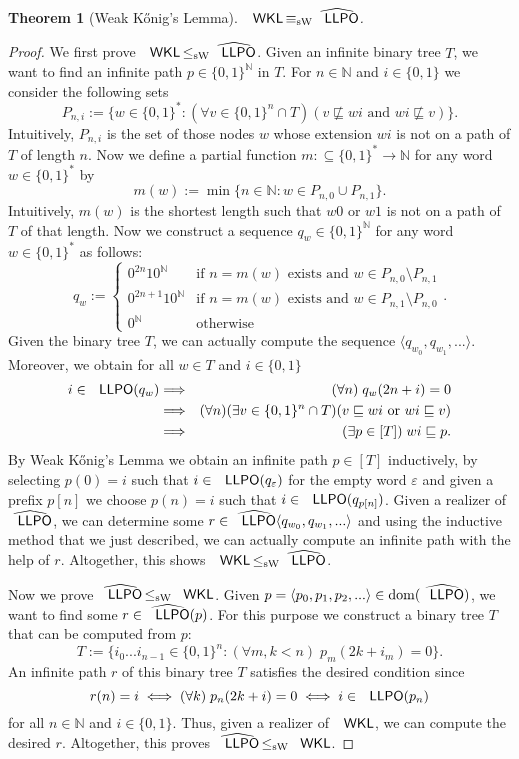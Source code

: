\documentclass[jsl,10pt]{noasl}
\def\IN{{\mathbb{N}}}
\def\TO{\Longrightarrow}
\def\In{\subseteq}
\def\prefix{\sqsubseteq}
\def\dom{{\rm dom}}
\def\LLPO{\text{\rm\sffamily LLPO}}
\def\WKL{\text{\rm\sffamily WKL}}
\def\LLPO{\text{\rm\sffamily LLPO}}
\def\leqSW{\mathop{\leq_{\mathrm{sW}}}}
\def\equivSW{\mathop{\equiv_{\mathrm{sW}}}}
\newtheorem{theorem}[proposition]{Theorem}
\begin{document}
\begin{theorem}[Weak K\H{o}nig's Lemma]
\label{thm:WKL}
$\WKL\equivSW\widehat{\LLPO}$.
\end{theorem}
\begin{proof}
We first prove $\WKL\leqSW\widehat{\LLPO}$. Given an infinite binary tree $T$,
we want to find an infinite path $p\in\{0,1\}^\IN$ in $T$.
For $n\in\IN$ and $i\in\{0,1\}$ we consider the following sets
\[P_{n,i}:=\{w\in\{0,1\}^*:(\forall v\in\{0,1\}^n\cap T)(v\not\prefix wi\mbox{ and }wi\not\prefix v)\}.\]
Intuitively, $P_{n,i}$ is the set of those nodes $w$ whose extension $wi$ is not on a path of $T$ of length
$n$.
Now we define a partial function $m:\In\{0,1\}^*\to\IN$ for any word $w\in\{0,1\}^*$
by
\[m(w):=\min\{n\in\IN:w\in P_{n,0}\cup P_{n,1}\}.\]
Intuitively, $m(w)$ is the shortest length such that $w0$ or $w1$ is not on a path of $T$ of that length.
Now we construct a sequence $q_w\in\{0,1\}^\IN$ for any word $w\in\{0,1\}^*$ 
as follows:
\[q_w:=\left\{\begin{array}{ll}
0^{2n}10^\IN   & \mbox{if $n=m(w)$ exists and $w\in P_{n,0}\setminus P_{n,1}$}\\
0^{2n+1}10^\IN & \mbox{if $n=m(w)$ exists and $w\in P_{n,1}\setminus P_{n,0}$}\\
0^\IN          & \mbox{otherwise}
\end{array}\right..\]
Given the binary tree $T$, we can actually compute the sequence $\langle q_{w_0},q_{w_1},...\rangle$.
Moreover, we obtain for all $w\in T$ and $i\in\{0,1\}$
\begin{eqnarray*}
       i\in\LLPO(q_w)
&\TO& (\forall n)\;q_w(2n+i)=0\\
&\TO& (\forall n)(\exists v\in\{0,1\}^n\cap T)(v\prefix wi\mbox{ or }wi\prefix v)\\
&\TO& (\exists p\in[T])\;wi\prefix p.
\end{eqnarray*}
By Weak K\H{o}nig's Lemma we obtain an infinite path $p\in[T]$ inductively,
by selecting $p(0)=i$ such that $i\in\LLPO(q_\varepsilon)$ for the empty word $\varepsilon$ 
and given a prefix $p[n]$
we choose $p(n)=i$ such that $i\in\LLPO(q_{p[n]})$.
Given a realizer of $\widehat{\LLPO}$, we can determine some
$r\in\widehat{\LLPO}\langle q_{w_0},q_{w_1},...\rangle$ and using
the inductive method that we just described, we can actually
compute an infinite path with the help of $r$.
Altogether, this shows $\WKL\leqSW\widehat{\LLPO}$.

Now we prove $\widehat{\LLPO}\leqSW\WKL$.
Given $p=\langle p_0,p_1,p_2,...\rangle\in\dom(\widehat{\LLPO})$, we want to
find some $r\in\widehat{\LLPO}(p)$.
For this purpose we construct a binary tree $T$ that can be computed from $p$:
\[T:=\{i_0...i_{n-1}\in\{0,1\}^{n}:(\forall m,k<n)\;p_m(2k+i_m)=0\}.\]
An infinite path $r$ of this binary tree $T$ satisfies the desired condition
since 
\[r(n)=i\iff(\forall k)\;p_n(2k+i)=0\iff i\in\LLPO(p_n)\]
for all $n\in\IN$ and $i\in\{0,1\}$. Thus, given a realizer of $\WKL$,
we can compute the desired $r$. Altogether, this proves $\widehat{\LLPO}\leqSW\WKL$.
\end{proof}
\end{document}
